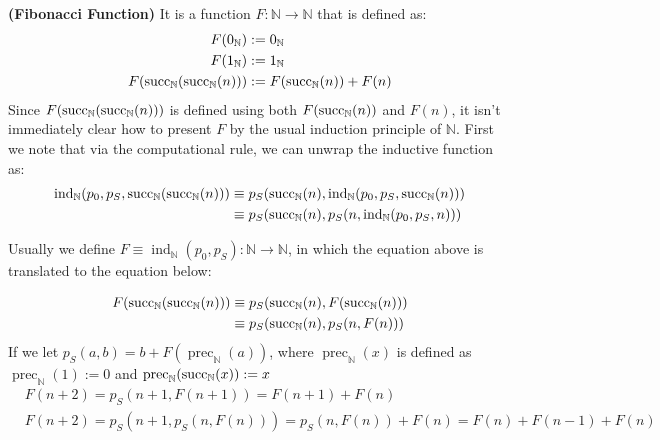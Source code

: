 \begin{definition}{\textbf{(Fibonacci Function)}}
    It is a function $F:\mathbb{N}\rightarrow\mathbb{N}$ that is defined as:
    \begin{equation*}
    \begin{aligned} 
        F(0_\mathbb{N})&:=0_\mathbb{N} \\ 
        F(1_\mathbb{N})&:=1_\mathbb{N} \\ 
        F(\operatorname{succ}_\mathbb{N}(\operatorname{succ}_\mathbb{N}(n))) &:= F(\operatorname{succ}_\mathbb{N}(n)) + F(n) 
    \end{aligned}
    \end{equation*}
    Since $F(\operatorname{succ}_\mathbb{N}(\operatorname{succ}_\mathbb{N}(n)))$ is defined using both $F(\operatorname{succ}_\mathbb{N}(n))$ and $F(n)$, it isn't immediately clear how to present $F$ by the usual induction principle of $\mathbb{N}$. First we note that via the computational rule, we can unwrap the inductive function as:
    \begin{equation*}
    \begin{aligned}
        \operatorname{ind}_\mathbb{N}(p_0,p_S, \operatorname{succ}_\mathbb{N}( \operatorname{succ}_\mathbb{N}(n))) &\equiv p_S( \operatorname{succ}_\mathbb{N}(n), \operatorname{ind}_\mathbb{N}(p_0, p_S,  \operatorname{succ}_\mathbb{N}(n))) \\
        &\equiv p_S( \operatorname{succ}_\mathbb{N}(n), p_S(n, \operatorname{ind}_\mathbb{N}(p_0, p_S, n))) \\
    \end{aligned}
    \end{equation*}
    
    Usually we define $F\equiv\operatorname{ind}_\mathbb{N}(p_0, p_S):\mathbb{N}\to \mathbb{N}$, in which the equation above is translated to the equation below:

    \begin{equation*}
    \begin{aligned}
        F(\operatorname{succ}_\mathbb{N}( \operatorname{succ}_\mathbb{N}(n))) &\equiv p_S( \operatorname{succ}_\mathbb{N}(n), F(\operatorname{succ}_\mathbb{N}(n))) \\
        &\equiv p_S( \operatorname{succ}_\mathbb{N}(n), p_S(n, F(n))) 
    \end{aligned}
    \end{equation*}
    If we let $p_S(a, b)=b+F(\operatorname{prec}_\mathbb{N}(a))$, where $\operatorname{prec}_\mathbb{N}(x)$ is defined as $\operatorname{prec}_\mathbb{N}(1):=0$ and $\operatorname{prec}_\mathbb{N}(\operatorname{succ}_\mathbb{N}(x)):=x$
    \begin{equation*}
    \begin{aligned}
        &F(n+2) = p_S(n+1, F(n+1)) = F(n+1) + F(n) \\
        &F(n+2) =p_S(n+1, p_S(n, F(n))) = p_S(n, F(n)) + F(n) = F(n) + F(n-1) + F(n)
    \end{aligned}
    \end{equation*}
\end{definition}

